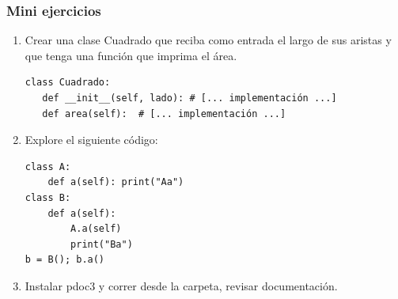 \documentclass[14pt,aspectratio=169,xcolor=dvipsnames]{beamer}
\begin{document}
\begin{frame}\frametitle{Mini ejercicios}
    \begin{footnotesize}
    \begin{enumerate}
        \item Crear una clase Cuadrado que reciba como entrada el largo de sus aristas y que tenga una función que imprima el área.
    \begin{verbatim}
class Cuadrado:
   def __init__(self, lado): # [... implementación ...]
   def area(self):  # [... implementación ...]
    \end{verbatim}
        \item Explore el siguiente código:
    \begin{verbatim}
class A:
    def a(self): print("Aa")
class B:
    def a(self):
        A.a(self)
        print("Ba")
b = B(); b.a()
        \end{verbatim}
        \item Instalar pdoc3 y correr  desde la carpeta, revisar documentación.
    \end{enumerate}
    \end{footnotesize}
\end{frame}
\begin{frame}
    \maketitle
\end{frame}
\end{document}
